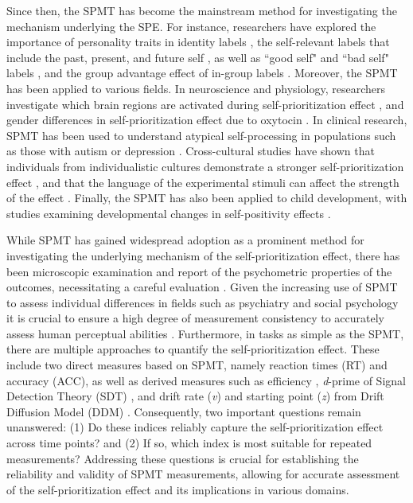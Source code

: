 \documentclass[sn-apa]{sn-jnl}%
\theoremstyle{thmstyleone}%
\theoremstyle{thmstyletwo}%
\theoremstyle{thmstylethree}%
\begin{document}
Since then, the SPMT has become the mainstream method for investigating the mechanism underlying the SPE. For instance, researchers have explored the importance of personality traits in identity labels \parencite{golubickis2020parts}, the self-relevant labels that include the past, present, and future self \parencite{golubickis2017self}, as well as ``good self" and ``bad self" labels \parencite{hu2020good}, and the group advantage effect of in-group labels \parencite{constable2019relevant,constable2020sticking,enock2018self,enock2020overlap}. Moreover, the SPMT has been applied to various fields. In neuroscience and physiology, researchers investigate which brain regions are activated during self-prioritization effect \parencite{feng2018neural,humphreys2015the}, and gender differences in self-prioritization effect due to oxytocin \parencite{feng2020effect}. In clinical research, SPMT has been used to understand atypical self-processing in populations such as those with autism or depression \parencite{gillespie2018the,nijhof2019self,sui2017the}. Cross-cultural studies have shown that individuals from individualistic cultures demonstrate a stronger self-prioritization effect \parencite{jiang2019cultural}, and that the language of the experimental stimuli can affect the strength of the effect \parencite{ivaz2016the}. Finally, the SPMT has also been applied to child development, with studies examining developmental changes in self-positivity effects \parencite{maire2020a,zhou2019self}. 

While SPMT has gained widespread adoption as a prominent method for investigating the underlying mechanism of the self-prioritization effect, there has been microscopic examination and report of the psychometric properties of the outcomes, necessitating a careful evaluation \parencite{parsons2019psychological,zorowitz2023}. Given the increasing use of SPMT to assess individual differences in fields such as psychiatry \parencite{liu2022depression} and social psychology \parencite{enock2018self} it is crucial to ensure a high degree of measurement consistency to accurately assess human perceptual abilities \parencite{parsons2019psychological}. Furthermore, in tasks as simple as the SPMT, there are multiple approaches to quantify the self-prioritization effect. These include two direct measures based on SPMT, namely reaction times (RT) and accuracy (ACC), as well as derived measures such as efficiency \parencite{humphreys2015the,stoeber2008perfectionism}, \textit{d}-prime of Signal Detection Theory (SDT) \parencite{hu2020good,sui2012perceptual}, and drift rate (\textit{v}) and starting point (\textit{z}) from Drift Diffusion Model (DDM) \parencite{golubickis2017self}. Consequently, two important questions remain unanswered: (1) Do these indices reliably capture the self-prioritization effect across time points? and (2) If so, which index is most suitable for repeated measurements? Addressing these questions is crucial for establishing the reliability and validity of SPMT measurements, allowing for accurate assessment of the self-prioritization effect and its implications in various domains.
\end{document}
